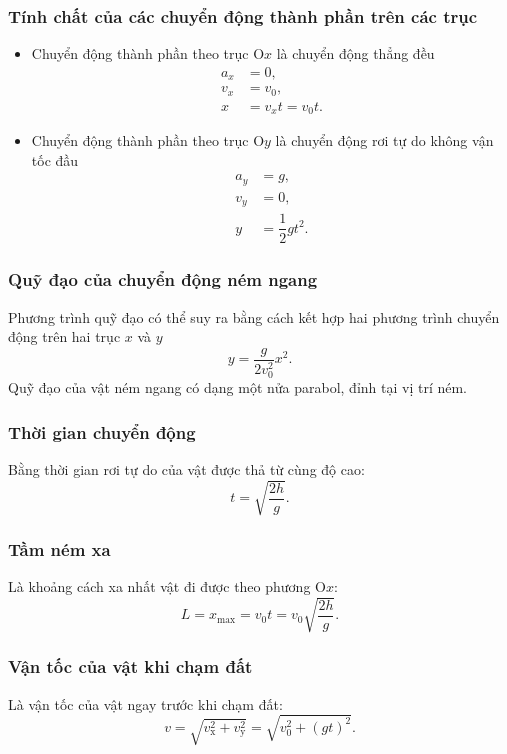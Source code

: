 \subsubsection{Tính chất của các chuyển động thành phần trên các trục}
	\begin{itemize}
		\item Chuyển động thành phần theo trục O$x$ là chuyển động thẳng đều
			\begin{align*}
				a_x&=0,\\
				v_x&=v_0,\\
				x&=v_xt=v_0t.
			\end{align*}
		\item Chuyển động thành phần theo trục O$y$ là chuyển động rơi tự do không vận tốc đầu
			\begin{align*}
				a_y&=g,\\
				v_y&=0,\\
				y&=\dfrac{1}{2}gt^{2}.
			\end{align*}
	\end{itemize}

\subsubsection{Quỹ đạo của chuyển động ném ngang}
	Phương trình quỹ đạo có thể suy ra bằng cách kết hợp hai phương trình chuyển động trên hai trục $x$ và $y$ 
	\begin{equation*}
		y=\dfrac{g}{2v_0^2}x^2.
	\end{equation*}
	 Quỹ đạo của vật ném ngang có dạng một nửa parabol, đỉnh tại vị trí ném.

\subsubsection{Thời gian chuyển động}
Bằng thời gian rơi tự do của vật được thả từ cùng độ cao:
\begin{equation*}
	t=\sqrt{\dfrac{2h}{g}}.
\end{equation*}
\subsubsection{Tầm ném xa}
Là khoảng cách xa nhất vật đi được theo phương O$x$:
\begin{equation*}
	L = x_{\text{max}} = v_0 t = v_0 \sqrt{\dfrac{2h}{g}}.
\end{equation*}
\subsubsection{Vận tốc của vật khi chạm đất}
Là vận tốc của vật ngay trước khi chạm đất:
\begin{equation*}
	v=\sqrt{v^2_{\text{x}} + v^2_{\text{y}} } = \sqrt{v^2_0+ (gt)^2}.
\end{equation*}
